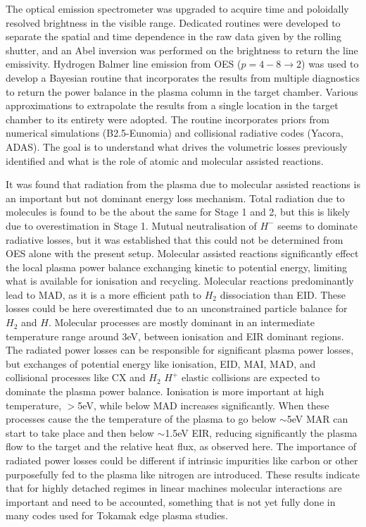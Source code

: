 The optical emission spectrometer was upgraded to acquire time and poloidally resolved brightness in the visible range. Dedicated routines were developed to separate the spatial and time dependence in the raw data given by the rolling shutter, and an Abel inversion was performed on the brightness to return the line emissivity. Hydrogen Balmer line emission from OES ($p=4-8 \rightarrow 2$) was used to develop a Bayesian routine that incorporates the results from multiple diagnostics to return the power balance in the plasma column in the target chamber. Various approximations to extrapolate the results from a single location in the target chamber to its entirety were adopted. The routine incorporates priors from numerical simulations (B2.5-Eunomia) and collisional radiative codes (Yacora, ADAS). The goal is to understand what drives the volumetric losses previously identified and what is the role of atomic and molecular assisted reactions.

It was found that radiation from the plasma due to molecular assisted reactions is an important but not dominant energy loss mechanism. Total radiation due to molecules is found to be the about the same for Stage 1 and 2, but this is likely due to overestimation in Stage 1. Mutual neutralisation of ${H}^-$ seems to dominate radiative losses, but it was established that this could not be determined from OES alone with the present setup. Molecular assisted reactions significantly effect the local plasma power balance exchanging kinetic to potential energy, limiting what is available for ionisation and recycling. Molecular reactions predominantly lead to MAD, as it is a more efficient path to $H_2$ dissociation than EID. These losses could be here overestimated due to an unconstrained particle balance for $H_2$ and $H$. Molecular processes are mostly dominant in an intermediate temperature range around 3eV, between ionisation and EIR dominant regions. The radiated power losses can be responsible for significant plasma power losses, but exchanges of potential energy like ionisation, EID, MAI, MAD, and collisional processes like CX and $H_2$ $H^+$ elastic collisions are expected to dominate the plasma power balance. Ionisation is more important at high temperature, $>$5eV, while below MAD increases significantly. When these processes cause the the temperature of the plasma to go below $\sim$5eV MAR can start to take place and then below $\sim$1.5eV EIR, reducing significantly the plasma flow to the target and the relative heat flux, as observed here. The importance of radiated power losses could be different if intrinsic impurities like carbon or other purposefully fed to the plasma like nitrogen are introduced. These results indicate that for highly detached regimes in linear machines molecular interactions are important and need to be accounted, something that is not yet fully done in many codes used for Tokamak edge plasma studies.
